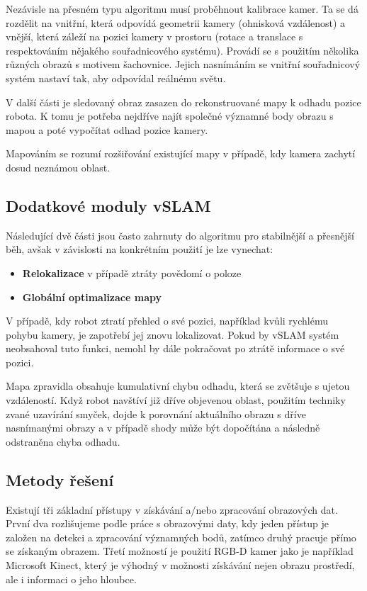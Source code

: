 \documentclass[12pt,a4paper]{article}
\begin{document}
Nezávisle na přesném typu algoritmu musí proběhnout kalibrace kamer. Ta se dá rozdělit na vnitřní, která odpovídá geometrii kamery (ohnisková vzdálenost) a vnější, která záleží na pozici kamery v prostoru (rotace a translace s respektováním nějakého souřadnicového systému). Provádí se s použitím několika různých obrazů s motivem šachovnice. Jejich nasnímáním se vnitřní souřadnicový systém nastaví tak, aby odpovídal reálnému světu.

V další části je sledovaný obraz zasazen do rekonstruované mapy k odhadu pozice robota. K tomu je potřeba nejdříve najít společné významné body obrazu s mapou a poté vypočítat odhad pozice kamery.

Mapováním se rozumí rozšiřování existující mapy v případě, kdy kamera zachytí dosud neznámou oblast.

\subsection*{Dodatkové moduly vSLAM}
Následující dvě části jsou často zahrnuty do algoritmu pro stabilnější a přesnější běh, avšak v závislosti na konkrétním použití je lze vynechat:
\begin{itemize}
\item \textbf{Relokalizace} v případě ztráty povědomí o poloze
\item \textbf{Globální optimalizace mapy}
\end{itemize}

V případě, kdy robot ztratí přehled o své pozici, například kvůli rychlému pohybu kamery, je zapotřebí jej znovu lokalizovat. Pokud by vSLAM systém neobsahoval tuto funkci, nemohl by dále pokračovat po ztrátě informace o své pozici.

Mapa zpravidla obsahuje kumulativní chybu odhadu, která se zvětšuje s ujetou \linebreak vzdáleností. Když robot navštíví již dříve objevenou oblast, použitím techniky zvané uzavírání smyček, dojde k porovnání aktuálního obrazu s dříve nasnímanými obrazy a v případě shody může být dopočítána a následně odstraněna chyba odhadu.

\subsection{Metody řešení}
Existují tři základní přístupy v získávání a/nebo zpracování obrazových dat. První dva rozlišujeme podle práce s obrazovými daty, kdy jeden přístup je založen na detekci a zpracování významných bodů, zatímco druhý pracuje přímo se získaným obrazem. Třetí možností je použití RGB-D kamer jako je například Microsoft Kinect, který je výhodný v možnosti získávání nejen obrazu prostředí, ale i informaci o jeho hloubce. 
\end{document}
